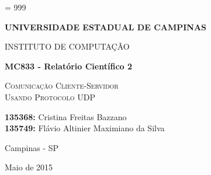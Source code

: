 \documentclass[12pt,a4paper]{article}
\begin{document}
\tolerance = 999
\sloppy


\thispagestyle{empty}

\begin{center}{\large \bf UNIVERSIDADE ESTADUAL DE CAMPINAS} \end{center}
\begin{center}{\large INSTITUTO DE COMPUTAÇÃO} \end{center}

\begin{center}
\begin{minipage}[tl]{31mm}
\end{minipage}
\end{center}

\vspace*{3.5cm}

\begin{center}
{\Large \bf MC833 - Relatório Científico 2}

\vspace*{2.0cm}

\textsc{\Large Comunicação Cliente-Servidor} \\ [0.1cm]
\textsc{\Large Usando Protocolo UDP}

\vspace{2.5cm}

\textbf{135368:} Cristina Freitas Bazzano \\
\textbf{135749:} Flávio Altinier Maximiano da Silva

\vspace{7.5cm}

{\large Campinas - SP}
\vspace*{0.2cm}

{\large Maio de 2015}
\end{center}

\clearpage

\onehalfspacing
\tableofcontents 
\clearpage
\onehalfspacing

\begin{abstract}
Este trabalho focou-se no estudo temporal de redes cliente-servidor baseadas em comunicação UDP e um comparativo com um estudo anterior baseado em comunicação TCP. Foi implementado um serviço de locadora de filmes baseado em {\it MySQL} no servidor, e ao cliente foram adicionadas diversas operações de acesso ao banco, baseando-se em operações de consultas pequenas, grandes e de escrita. Observou-se que a escrita no banco é o processo mais lento, enquanto operações de consultas extensas são apenas brevemente mais lentas que buscas mais curtas, o que também ocorreu com o TCP. Outro ponto interessante medido foi a confiabilidade das transmissões, em ambos os protocolos nenhuma mensagem foi perdida. Notamos também que o tempo total de comunicação no protocolo UDP foi cerca de 10 vezes menor que o TCP. Além disso, uma breve análise de tamanho de código mostrou que operações de redes não são as mais presentes em uma implementação desse tipo.
\end{abstract}
\end{document}
